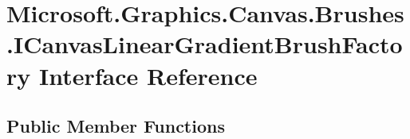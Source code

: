 \hypertarget{interface_microsoft_1_1_graphics_1_1_canvas_1_1_brushes_1_1_i_canvas_linear_gradient_brush_factory}{}\section{Microsoft.\+Graphics.\+Canvas.\+Brushes.\+I\+Canvas\+Linear\+Gradient\+Brush\+Factory Interface Reference}
\label{interface_microsoft_1_1_graphics_1_1_canvas_1_1_brushes_1_1_i_canvas_linear_gradient_brush_factory}
\subsection*{Public Member Functions}
